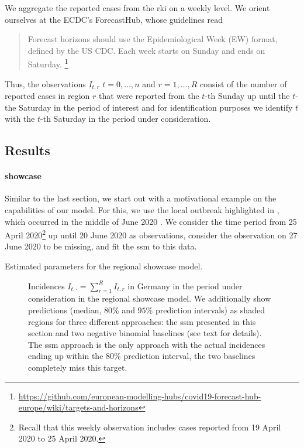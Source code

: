We aggregate the reported cases from the \acrshort{rki} on a weekly level. We orient ourselves at the ECDC's ForecastHub, whose guidelines read
\begin{quote}
    Forecast horizons should use the Epidemiological Week (EW) format, defined by the US CDC. Each week starts on Sunday and ends on Saturday. \footnote{\url{https://github.com/european-modelling-hubs/covid19-forecast-hub-europe/wiki/targets-and-horizons}}
\end{quote}
Thus, the observations $I_{t, r}$ $t=0, \dots, n$ and $r = 1, \dots, R$ consist of the number of reported cases in region $r$ that were reported from the $t$-th Sunday up until the $t$-the Saturday in the period of interest and for identification purposes we identify $t$ with the $t$-th Saturday in the period under consideration. 

\subsection{Results}


\paragraph{showcase}
Similar to the last section, we start out with a motivational example on the capabilities of our model. For this, we use the local outbreak highlighted in , which occurred in the middle of June 2020 \citep{Gunther2020SARSCoV2}. We consider the time period from 25 April 2020\footnote{Recall that this weekly observation includes cases reported from 19 April 2020 to 25 April 2020.} up until 20 June 2020 as observations, consider the observation on 27 June 2020 to be missing, and fit the \acrshort{ssm} to this data. 

\begin{table}
    \centering
    
    \caption{Estimated parameters for the regional showcase model.}
    \label{tab:regional_showcase_theta}
\end{table}


\begin{figure}
    \resizebox{\textwidth}{!}{%
    }
    \caption{Incidences $I_{t,\cdot} = \sum_{r = 1}^R I_{t,r}$ in Germany in the period under consideration in the regional showcase model. We additionally show predictions (median, $80\%$ and $95\%$ prediction intervals) as shaded regions for three different approaches: the \acrshort{ssm} presented in this section and two negative binomial baselines (see text for details). The \acrshort{ssm} approach is the only approach with the actual incidences ending up within the $80\%$ prediction interval, the two baselines completely miss this target.}
    \label{fig:regional_showcase_prediction.tex}
\end{figure}

